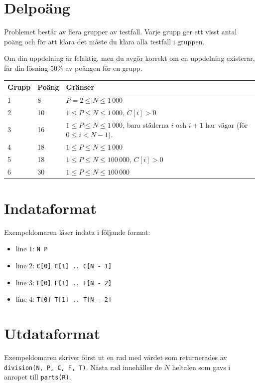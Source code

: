 \section*{Delpoäng}
Problemet består av flera grupper av testfall. Varje grupp ger ett visst antal poäng och för att klara det måste du klara alla testfall i gruppen.

Om din uppdelning är felaktig, men du avgör korrekt om en uppdelning existerar, får din lösning $50\%$ av poängen för en grupp.

\begin{tabular}{|l|l|l|}
  \hline
  \textbf{Grupp} & \textbf{Poäng} & \textbf{Gränser} \\ \hline
  1 & 8 & $P = 2 \le N \le 1\,000$ \\ \hline
  2 & 10 & $1 \le P \le N \le 1\,000$, $C[i] > 0$ \\ \hline
  3 & 16 & $1 \le P \le N \le 1\,000$, bara städerna $i$ och $i + 1$ har vägar (för $0 \le i < N - 1$). \\ \hline
  4 & 18 & $1 \le P \le N \le 1\,000$ \\ \hline
  5 & 18 & $1 \le P \le N \le 100\,000$, $C[i] > 0$ \\ \hline
  6 & 30 & $1 \le P \le N \le 100\,000$ \\ \hline
\end{tabular}

\section*{Indataformat}
Exempeldomaren läser indata i följande format:

\begin{itemize}
  \item line $1$: \texttt{N P}
  \item line $2$: \texttt{C[0] C[1] .. C[N - 1]}
  \item line $3$: \texttt{F[0] F[1] .. F[N - 2]}
  \item line $4$: \texttt{T[0] T[1] .. T[N - 2]}
\end{itemize}

\section*{Utdataformat}
Exempeldomaren skriver först ut en rad med värdet som returnerades av \texttt{division(N, P, C, F, T)}.
Nästa rad innehåller de $N$ heltalen som gavs i anropet till \texttt{parts(R)}.

